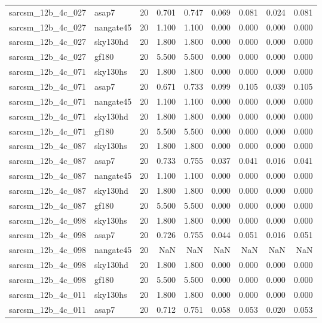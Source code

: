 \begin{tabular}{llrrrrrrr}
sarcsm\_12b\_4c\_027 & asap7 & 20 & 0.701 & 0.747 & 0.069 & 0.081 & 0.024 & 0.081 \\
sarcsm\_12b\_4c\_027 & nangate45 & 20 & 1.100 & 1.100 & 0.000 & 0.000 & 0.000 & 0.000 \\
sarcsm\_12b\_4c\_027 & sky130hd & 20 & 1.800 & 1.800 & 0.000 & 0.000 & 0.000 & 0.000 \\
sarcsm\_12b\_4c\_027 & gf180 & 20 & 5.500 & 5.500 & 0.000 & 0.000 & 0.000 & 0.000 \\
sarcsm\_12b\_4c\_071 & sky130hs & 20 & 1.800 & 1.800 & 0.000 & 0.000 & 0.000 & 0.000 \\
sarcsm\_12b\_4c\_071 & asap7 & 20 & 0.671 & 0.733 & 0.099 & 0.105 & 0.039 & 0.105 \\
sarcsm\_12b\_4c\_071 & nangate45 & 20 & 1.100 & 1.100 & 0.000 & 0.000 & 0.000 & 0.000 \\
sarcsm\_12b\_4c\_071 & sky130hd & 20 & 1.800 & 1.800 & 0.000 & 0.000 & 0.000 & 0.000 \\
sarcsm\_12b\_4c\_071 & gf180 & 20 & 5.500 & 5.500 & 0.000 & 0.000 & 0.000 & 0.000 \\
sarcsm\_12b\_4c\_087 & sky130hs & 20 & 1.800 & 1.800 & 0.000 & 0.000 & 0.000 & 0.000 \\
sarcsm\_12b\_4c\_087 & asap7 & 20 & 0.733 & 0.755 & 0.037 & 0.041 & 0.016 & 0.041 \\
sarcsm\_12b\_4c\_087 & nangate45 & 20 & 1.100 & 1.100 & 0.000 & 0.000 & 0.000 & 0.000 \\
sarcsm\_12b\_4c\_087 & sky130hd & 20 & 1.800 & 1.800 & 0.000 & 0.000 & 0.000 & 0.000 \\
sarcsm\_12b\_4c\_087 & gf180 & 20 & 5.500 & 5.500 & 0.000 & 0.000 & 0.000 & 0.000 \\
sarcsm\_12b\_4c\_098 & sky130hs & 20 & 1.800 & 1.800 & 0.000 & 0.000 & 0.000 & 0.000 \\
sarcsm\_12b\_4c\_098 & asap7 & 20 & 0.726 & 0.755 & 0.044 & 0.051 & 0.016 & 0.051 \\
sarcsm\_12b\_4c\_098 & nangate45 & 20 & NaN & NaN & NaN & NaN & NaN & NaN \\
sarcsm\_12b\_4c\_098 & sky130hd & 20 & 1.800 & 1.800 & 0.000 & 0.000 & 0.000 & 0.000 \\
sarcsm\_12b\_4c\_098 & gf180 & 20 & 5.500 & 5.500 & 0.000 & 0.000 & 0.000 & 0.000 \\
sarcsm\_12b\_4c\_011 & sky130hs & 20 & 1.800 & 1.800 & 0.000 & 0.000 & 0.000 & 0.000 \\
sarcsm\_12b\_4c\_011 & asap7 & 20 & 0.712 & 0.751 & 0.058 & 0.053 & 0.020 & 0.053 \\

\end{tabular}
